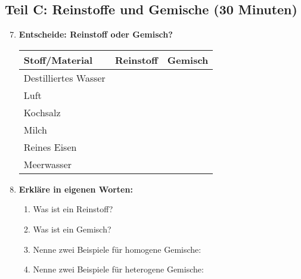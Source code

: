 \subsection*{Teil C: Reinstoffe und Gemische (30 Minuten)}

\begin{enumerate}[label=\arabic*.]
    \setcounter{enumi}{6}

    \item \textbf{Entscheide: Reinstoff oder Gemisch?}
    \vspace{0.5cm}

    \begin{tabular}{|p{4cm}|p{3cm}|p{3cm}|}
        \hline
        \textbf{Stoff/Material} & \textbf{Reinstoff} & \textbf{Gemisch} \\
        \hline
        Destilliertes Wasser & & \\
        \hline
        Luft & & \\
        \hline
        Kochsalz & & \\
        \hline
        Milch & & \\
        \hline
        Reines Eisen & & \\
        \hline
        Meerwasser & & \\
        \hline
    \end{tabular}

    \vspace{1cm}

    \item \textbf{Erkläre in eigenen Worten:}
    \vspace{0.5cm}

    \begin{enumerate}[label=\alph*)]
        \item Was ist ein Reinstoff?
        \vspace{2cm}

        \item Was ist ein Gemisch?
        \vspace{2cm}

        \item Nenne zwei Beispiele für homogene Gemische:
        \vspace{1cm}

        \item Nenne zwei Beispiele für heterogene Gemische:
        \vspace{1cm}
    \end{enumerate}

\end{enumerate}

